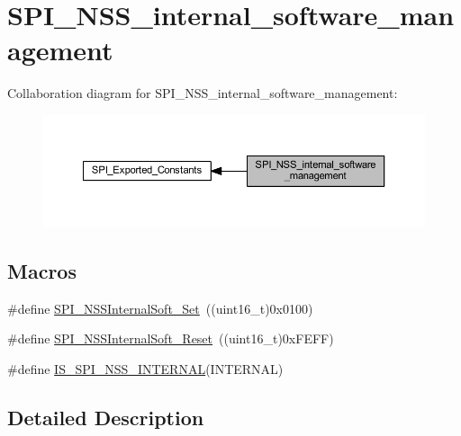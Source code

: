 \hypertarget{group___s_p_i___n_s_s__internal__software__management}{}\section{S\+P\+I\+\_\+\+N\+S\+S\+\_\+internal\+\_\+software\+\_\+management}
\label{group___s_p_i___n_s_s__internal__software__management}
Collaboration diagram for S\+P\+I\+\_\+\+N\+S\+S\+\_\+internal\+\_\+software\+\_\+management\+:
\nopagebreak
\begin{figure}[H]
\begin{center}
\leavevmode
\includegraphics[width=350pt]{group___s_p_i___n_s_s__internal__software__management}
\end{center}
\end{figure}
\subsection*{Macros}
\begin{DoxyCompactItemize}
\item 
\#define \hyperlink{group___s_p_i___n_s_s__internal__software__management_ga6b2102816167d12140648dba49a192a7}{S\+P\+I\+\_\+\+N\+S\+S\+Internal\+Soft\+\_\+\+Set}~((uint16\+\_\+t)0x0100)
\item 
\#define \hyperlink{group___s_p_i___n_s_s__internal__software__management_ga292ec7bc0cd362d61b3b5eed620522c2}{S\+P\+I\+\_\+\+N\+S\+S\+Internal\+Soft\+\_\+\+Reset}~((uint16\+\_\+t)0x\+F\+E\+F\+F)
\item 
\#define \hyperlink{group___s_p_i___n_s_s__internal__software__management_ga7036de442206fb8b365528c115345b36}{I\+S\+\_\+\+S\+P\+I\+\_\+\+N\+S\+S\+\_\+\+I\+N\+T\+E\+R\+N\+AL}(I\+N\+T\+E\+R\+N\+AL)
\end{DoxyCompactItemize}


\subsection{Detailed Description}



